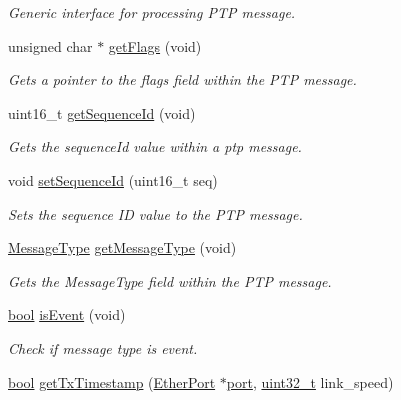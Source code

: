 \begin{DoxyCompactItemize}
\begin{DoxyCompactList}\small\item\em Generic interface for processing P\+TP message. \end{DoxyCompactList}\item 
unsigned char $\ast$ \hyperlink{class_p_t_p_message_common_aa75ce7cb63073d090a15ca2c28b6819a}{get\+Flags} (void)
\begin{DoxyCompactList}\small\item\em Gets a pointer to the flags field within the P\+TP message. \end{DoxyCompactList}\item 
uint16\+\_\+t \hyperlink{class_p_t_p_message_common_abd5cac5701120cbbfc56129b31fa801f}{get\+Sequence\+Id} (void)
\begin{DoxyCompactList}\small\item\em Gets the sequence\+Id value within a ptp message. \end{DoxyCompactList}\item 
void \hyperlink{class_p_t_p_message_common_a7fc215800bddc8a39e50e463ffbe651a}{set\+Sequence\+Id} (uint16\+\_\+t seq)
\begin{DoxyCompactList}\small\item\em Sets the sequence ID value to the P\+TP message. \end{DoxyCompactList}\item 
\hyperlink{avbts__message_8hpp_ac6606ebe91c8ac66a2c314c79f5ab013}{Message\+Type} \hyperlink{class_p_t_p_message_common_aa9e0a02eadc0da0ddbade7fdb09d9309}{get\+Message\+Type} (void)
\begin{DoxyCompactList}\small\item\em Gets the Message\+Type field within the P\+TP message. \end{DoxyCompactList}\item 
\hyperlink{avb__gptp_8h_af6a258d8f3ee5206d682d799316314b1}{bool} \hyperlink{class_p_t_p_message_common_a2dd36fdb6a9dbfcfdab03f6162581373}{is\+Event} (void)
\begin{DoxyCompactList}\small\item\em Check if message type is event. \end{DoxyCompactList}\item 
\hyperlink{avb__gptp_8h_af6a258d8f3ee5206d682d799316314b1}{bool} \hyperlink{class_p_t_p_message_common_a715dccee35cbc56372f8b003600b8ef9}{get\+Tx\+Timestamp} (\hyperlink{class_ether_port}{Ether\+Port} $\ast$\hyperlink{gst__avb__playbin_8c_a63c89c04d1feae07ca35558055155ffb}{port}, \hyperlink{parse_8c_a6eb1e68cc391dd753bc8ce896dbb8315}{uint32\+\_\+t} link\+\_\+speed)

\end{DoxyCompactItemize}

